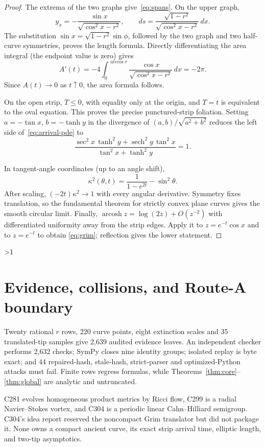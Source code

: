 \documentclass[10pt]{article}
\providecommand{\CRevisionRound}{2}
\newcommand{\arcosh}{\operatorname{arcosh}}
\begin{document}
\begin{proof}
The extrema of the two graphs give~\eqref{eq:spans}.  On the upper graph,
\[
 y_x=-\frac{\sin x}{\sqrt{\cos^2x-r^2}},\qquad
 ds=\frac{\sqrt{1-r^2}}{\sqrt{\cos^2x-r^2}}\,dx.
\]
The substitution $\sin x=\sqrt{1-r^2}\sin\phi$, followed by the two graph
and two half-curve symmetries, proves the length formula.  Directly
differentiating the area integral (the endpoint value is zero) gives
\[
 A'(t)=-4\int_0^{\arccos r}
 \frac{\cos x}{\sqrt{\cos^2x-r^2}}\,dx=-2\pi.
\]
Since $A(t)\to0$ as $t\uparrow0$, the area formula follows.

On the open strip, $T\leq0$, with equality only at the origin, and $T=t$
is equivalent to the oval equation.  This proves the precise punctured-strip
foliation.  Setting $a=-\tan x$, $b=-\tanh y$ in the divergence of
$(a,b)/\sqrt{a^2+b^2}$ reduces the left side of~\eqref{eq:arrival-pde} to
\[
 \frac{\sec^2x\,\tanh^2y+\operatorname{sech}^2y\,\tan^2x}
 {\tan^2x+\tanh^2y}=1.
\]

In tangent-angle coordinates (up to an angle shift),
\begin{equation}\label{eq:pressure}
 \kappa^2(\theta,t)=\frac1{1-e^{2t}}-\sin^2\theta.
\end{equation}
After scaling, $(-2t)\kappa^2\to1$ with every angular derivative.
Symmetry fixes translation, so the fundamental theorem for strictly convex
plane curves gives the smooth circular limit.  Finally,
$\arcosh z=\log(2z)+O(z^{-2})$ with differentiated uniformity away from the
strip edges.  Apply it to $z=e^{-t}\cos x$ and to $z=e^{-t}$ to obtain
\eqref{eq:grim}; reflection gives the lower statement.
\end{proof}
\fi

\ifnum\CRevisionRound>1
\section{Evidence, collisions, and Route-A boundary}
Twenty rational $r$ rows, 220 curve points, eight extinction scales and 35
translated-tip samples give 2,639 audited evidence leaves.  An independent
checker performs 2,632 checks; SymPy closes nine identity groups; isolated
replay is byte exact; and 44 repaired-hash, stale-hash, strict-parser and
optimized-Python attacks must fail.  Finite rows regress formulas, while
Theorems~\ref{thm:core}--\ref{thm:global} are analytic and untruncated.

C281 evolves homogeneous product metrics by Ricci flow, C299 is a radial
Navier--Stokes vortex, and C304 is a periodic linear Cahn--Hilliard
semigroup.  C304's idea report reserved the noncompact Grim translator but
did not package it.  None owns a compact ancient curve, its exact strip
arrival time, elliptic length, and two-tip asymptotics.
\end{document}

